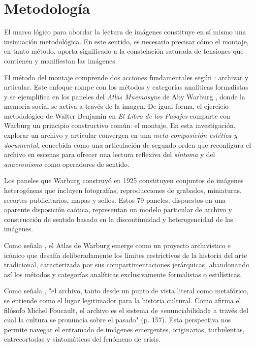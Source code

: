\section{Metodología}

El marco lógico para abordar la lectura de imágenes constituye en sí mismo una insinuación metodológica. En este sentido, es necesario precisar cómo el montaje, en tanto método, aporta significado a la constelación saturada de tensiones que contienen y manifiestan las imágenes.

\textcolor{edit30sept}{El método del montaje comprende dos acciones fundamentales según \parencite{Guasch2005}: archivar y articular. Este enfoque rompe con los métodos y categorías analíticas formalistas y se ejemplifica en los paneles del \textit{Atlas Mnemosyne} de Aby Warburg \parencite{Warburg2010}, donde la memoria social se activa a través de la imagen. De igual forma, el ejercicio metodológico de Walter Benjamin en \textit{El Libro de los Pasajes} \parencite{Benjamin2005Passages} comparte con Warburg un principio constructivo común: el montaje. En esta investigación, explorar un archivo y articular convergen en una \textit{meta-composición estética y documental}, concebida como una articulación de segundo orden que reconfigura el archivo en escenas para ofrecer una lectura reflexiva del \textit{síntoma} y del \textit{anacronismo} como operadores de sentido.}

Los paneles que Warburg construyó en 1925 constituyen conjuntos de imágenes heterogéneas que incluyen fotografías, reproducciones de grabados, miniaturas, recortes publicitarios, mapas y sellos. Estos 79 paneles, dispuestos en una aparente disposición caótica, representan un modelo particular de archivo y construcción de sentido basado en la discontinuidad y heterogeneidad de las imágenes.

Como señala \parencite{Guasch2011}, el Atlas de Warburg emerge como un proyecto archivístico e icónico que desafía deliberadamente los límites restrictivos de la historia del arte tradicional, caracterizada por sus compartimentaciones jerárquicas, abandonando así los métodos y categorías analíticas exclusivamente formalistas o estilísticas.

Como señala \parencite{Guasch2005}, "el archivo, tanto desde un punto de vista literal como metafórico, se entiende como el lugar legitimador para la historia cultural. Como afirma el filósofo Michel Foucault, el archivo es el sistema de «enunciabilidad» a través del cual la cultura se pronuncia sobre el pasado" (p. 157). Esta perspectiva nos permite navegar el entramado de imágenes emergentes, originarias, turbulentas, entrecortadas y sintomáticas del fenómeno de crisis.

